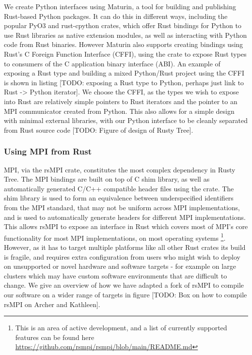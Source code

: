 We create Python interfaces using Maturin, a tool for building and publishing Rust-based Python packages. It can do this in different ways, including the popular PyO3 \cite{pyo32022github} and rust-cpython \cite{rustcpython2022github} crates, which offer Rust bindings for Python to use Rust libraries as native extension modules, as well as interacting with Python code from Rust binaries. However Maturin also supports creating bindings using Rust's C Foreign Function Interface (CFFI), using the  crate to expose Rust types to consumers of the C application binary interface (ABI). An example of exposing a Rust type and building a mixed Python/Rust project using the CFFI is shown in listing [TODO: exposing a Rust type to Python, perhaps just link to Rust -> Python iterator]. We choose the CFFI, as the types we wish to expose into Rust are relatively simple pointers to Rust iterators and the pointer to an MPI communicator created from Python. This also allows for a simple design with minimal external libraries, with our Python interface to be cleanly separated from Rust source code [TODO: Figure of design of Rusty Tree].

\subsubsection*{Using MPI from Rust}

MPI, via the rsMPI crate, constitutes the most complex dependency in Rusty Tree. The MPI bindings are built on top of C shim library, as well as automatically generated C/C++ compatible header files using the  crate. The shim library is used to form an equivalence between underspecified identifiers from the MPI standard, that may not be uniform across MPI implementations, and  is used to automatically generate headers for different MPI implementations. This allows rsMPI to expose an interface in Rust which covers most of MPI's core functionality for most MPI implementations, on most operating systems \footnote{This is an area of active development, and a list of currently supported features can be found here \url{https://github.com/rsmpi/rsmpi/blob/main/README.md}}. However, as it has to target multiple platforms like all other Rust crates its build is fragile, and requires extra configuration from users who might wish to deploy on unsupported or novel hardware and software targets - for example on large clusters which may have custom software environments that are difficult to change. We give an overview of how we have adapted a fork of rsMPI to compile our software on a wider range of targets in figure [TODO: Box on how to compile rsMPI on Archer and Kathleen].


